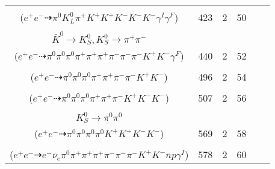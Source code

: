 \documentclass[landscape]{article}
\newcounter{rownumbers}
\newcommand\rn{\stepcounter{rownumbers}\arabic{rownumbers}}
\newcommand{\EOL}{\\} %
\newcommand{\topoTags}[1]{#1} %
\begin{document}
\begin{longtable}{clcccc}
\rn & \makecell[l]{ $ 
e^{+} e^{-} \rightarrow \pi^{0} \pi^{+} K^{0} K^{+} K^{-} K^{-} \phi \gamma^{I} ,
K^{0} \rightarrow K_{L}^{0} ,
\phi \rightarrow K^{+} K^{-} \gamma^{F} 
$ \\ ($
e^{+} e^{-} \dashrightarrow \pi^{0} K_{L}^{0} \pi^{+} K^{+} K^{+} K^{-} K^{-} K^{-} \gamma^{I} \gamma^{F} 
$) } & \topoTags{423 & }2 & 50 \EOL

\rn & \makecell[l]{ $ 
e^{+} e^{-} \rightarrow \pi^{0} \rho^{0} \pi^{+} K^{0} K^{*-} \phi ,
\rho^{0} \rightarrow \pi^{+} \pi^{-} \gamma^{F} ,
K^{0} \rightarrow K_{S}^{0} ,
K^{*-} \rightarrow \pi^{-} \bar{K}^{0} ,
\phi \rightarrow K^{+} K^{-} ,
K_{S}^{0} \rightarrow \pi^{0} \pi^{0} ,
$ \\ $
\bar{K}^{0} \rightarrow K_{S}^{0} ,
K_{S}^{0} \rightarrow \pi^{+} \pi^{-} 
$ \\ ($
e^{+} e^{-} \dashrightarrow \pi^{0} \pi^{0} \pi^{0} \pi^{+} \pi^{+} \pi^{+} \pi^{-} \pi^{-} \pi^{-} K^{+} K^{-} \gamma^{F} 
$) } & \topoTags{440 & }2 & 52 \EOL

\rn & \makecell[l]{ $ 
e^{+} e^{-} \rightarrow \pi^{0} \pi^{0} \rho^{0} \omega K^{+} K^{-} ,
\rho^{0} \rightarrow \pi^{+} \pi^{-} ,
\omega \rightarrow \pi^{0} \pi^{+} \pi^{-} 
$ \\ ($
e^{+} e^{-} \dashrightarrow \pi^{0} \pi^{0} \pi^{0} \pi^{+} \pi^{+} \pi^{-} \pi^{-} K^{+} K^{-} 
$) } & \topoTags{496 & }2 & 54 \EOL

\rn & \makecell[l]{ $ 
e^{+} e^{-} \rightarrow \pi^{+} \pi^{-} \rho^{+} K^{0} K^{-} \phi ,
\rho^{+} \rightarrow \pi^{0} \pi^{+} ,
K^{0} \rightarrow K_{S}^{0} ,
\phi \rightarrow K^{+} K^{-} ,
K_{S}^{0} \rightarrow \pi^{0} \pi^{0} 
$ \\ ($
e^{+} e^{-} \dashrightarrow \pi^{0} \pi^{0} \pi^{0} \pi^{+} \pi^{+} \pi^{-} K^{+} K^{-} K^{-} 
$) } & \topoTags{507 & }2 & 56 \EOL

\rn & \makecell[l]{ $ 
e^{+} e^{-} \rightarrow K^{0} \bar{K}^{0} \phi \phi ,
K^{0} \rightarrow K_{S}^{0} ,
\bar{K}^{0} \rightarrow K_{S}^{0} ,
\phi \rightarrow K^{+} K^{-} ,
\phi \rightarrow K^{+} K^{-} ,
K_{S}^{0} \rightarrow \pi^{0} \pi^{0} ,
$ \\ $
K_{S}^{0} \rightarrow \pi^{0} \pi^{0} 
$ \\ ($
e^{+} e^{-} \dashrightarrow \pi^{0} \pi^{0} \pi^{0} \pi^{0} K^{+} K^{+} K^{-} K^{-} 
$) } & \topoTags{569 & }2 & 58 \EOL

\rn & \makecell[l]{ $ 
e^{+} e^{-} \rightarrow \rho^{0} \pi^{+} \pi^{+} K^{*} K^{-} \Lambda \bar{\Sigma}^{*-} \gamma^{I} ,
\rho^{0} \rightarrow \pi^{+} \pi^{-} ,
K^{*} \rightarrow \pi^{-} K^{+} ,
\Lambda \rightarrow e^{-} \bar{\nu}_{e} p ,
\bar{\Sigma}^{*-} \rightarrow \pi^{-} \bar{\Lambda} ,
\bar{\Lambda} \rightarrow \pi^{0} \bar{n} 
$ \\ ($
e^{+} e^{-} \dashrightarrow e^{-} \bar{\nu}_{e} \pi^{0} \pi^{+} \pi^{+} \pi^{+} \pi^{-} \pi^{-} \pi^{-} K^{+} K^{-} \bar{n} p \gamma^{I} 
$) } & \topoTags{578 & }2 & 60 \EOL


\end{longtable}
\end{document}
